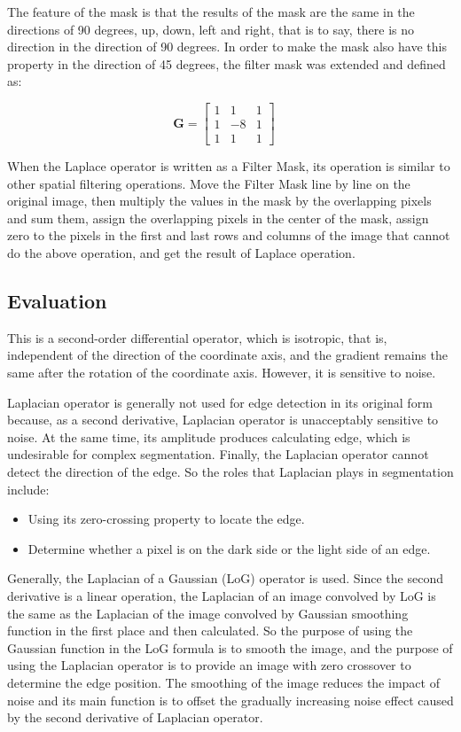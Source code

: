 \documentclass[review]{cvpr}
\begin{document}
The feature of the mask is that the results of the mask are the same in the directions of 90 degrees, up, down, left and right, that is to say, there is no direction in the direction of 90 degrees. In order to make the mask also have this property in the direction of 45 degrees, the filter mask was extended and defined as:

$$\mathbf{G}=\left[\begin{array}{lll}1 & 1 & 1 \\ 1 & -8 & 1 \\ 1 & 1 & 1\end{array}\right]\quad$$

When the Laplace operator is written as a Filter Mask, its operation is similar to other spatial filtering operations. Move the Filter Mask line by line on the original image, then multiply the values in the mask by the overlapping pixels and sum them, assign the overlapping pixels in the center of the mask, assign zero to the pixels in the first and last rows and columns of the image that cannot do the above operation, and get the result of Laplace operation.

\subsection{Evaluation}

This is a second-order differential operator, which is isotropic, that is, independent of the direction of the coordinate axis, and the gradient remains the same after the rotation of the coordinate axis. However, it is sensitive to noise.

Laplacian operator is generally not used for edge detection in its original form because, as a second derivative, Laplacian operator is unacceptably sensitive to noise. At the same time, its amplitude produces calculating edge, which is undesirable for complex segmentation. Finally, the Laplacian operator cannot detect the direction of the edge. So the roles that Laplacian plays in segmentation include:

\begin{itemize}
  \item Using its zero-crossing property to locate the edge.
  \item Determine whether a pixel is on the dark side or the light side of an edge.
\end{itemize}

Generally, the Laplacian of a Gaussian (LoG) operator is used. Since the second derivative is a linear operation, the Laplacian of an image convolved by LoG is the same as the Laplacian of the image convolved by Gaussian smoothing function in the first place and then calculated. So the purpose of using the Gaussian function in the LoG formula is to smooth the image, and the purpose of using the Laplacian operator is to provide an image with zero crossover to determine the edge position. The smoothing of the image reduces the impact of noise and its main function is to offset the gradually increasing noise effect caused by the second derivative of Laplacian operator.
\end{document}
